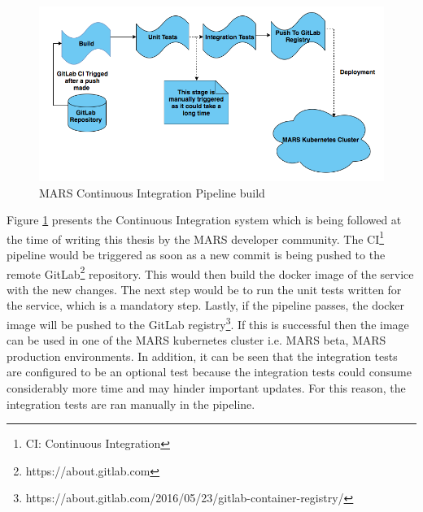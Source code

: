     \begin{figure}[H]
        \centering \includegraphics[scale=0.5]{grafiken/CIbuild.png}
        \caption{MARS Continuous Integration Pipeline build}
        \label{fig:CIbuild}
    \end{figure}

    Figure \ref{fig:CIbuild} presents the Continuous Integration system which is being followed at the time of writing this thesis by the MARS developer community.
    The CI\footnote{CI: Continuous Integration} pipeline would be triggered as soon as a new commit is being pushed to the remote 
    GitLab\footnote{https://about.gitlab.com} repository. This would then build the docker image of the service with the new changes. The next step would be to
    run the unit tests written for the service, which is a mandatory step. Lastly, if the pipeline passes, the docker image will be pushed
    to the GitLab registry\footnote{https://about.gitlab.com/2016/05/23/gitlab-container-registry/}. If this is successful then the image can be used in one of 
    the MARS kubernetes cluster i.e. MARS beta, MARS production environments. In addition,
    it can be seen that the integration tests are configured to be an optional test because the integration tests could consume considerably more time and may hinder
    important updates. For this reason, the integration tests are ran manually in the pipeline.